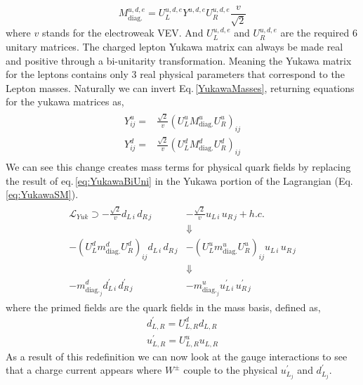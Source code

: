 %
\begin{equation}
\label{YukawaMasses} 
M^{u,d,e}_{\text{diag.}}= U^{u,d,e}_L Y^{u,d,e} U^{u,d,e}_R \frac{v}{\sqrt{2}} 
\end{equation} 
%
where $v$ stands for the electroweak VEV. And $U^{u,d,e}_L$ and $U^{u,d,e}_R$ are the required 6 unitary matrices.
%
{\color{gray} The charged lepton Yukawa matrix can always be made real and positive through a bi-unitarity transformation.  
%
Meaning the Yukawa matrix for the leptons contains only 3 real physical parameters that correspond to the Lepton masses. } 
%
Naturally we can invert Eq.\,\ref{YukawaMasses}, returning equations for the yukawa matrices as, 
\begin{align}
\label{eq:YukawaBiUni}
\begin{split}
Y^u_{ij} = & \frac{\sqrt{2}}{v} (U_L^u M^u_{\text{diag.}} U_R^u)_{ij} \\
Y^d_{ij} = & \frac{\sqrt{2}}{v} (U_L^d M^d_{\text{diag.}} U_R^d)_{ij}
\end{split}
\end{align}
%
We can see this change creates mass terms for physical quark fields by replacing the result of eq.\,\ref{eq:YukawaBiUni} in the Yukawa portion of the Lagrangian (Eq.\,\ref{eq:YukawaSM}).
%
\begin{align}
\begin{split}
\mathcal{L}_{Yuk} \supset -\frac{\sqrt{2}}{v} d_{L\,i} \, d_{R\,j} & - \frac{\sqrt{2}}{v} u_{L\,i} \, u_{R\,j} + h.c. \\ 
 & \Downarrow  \\
-(U_L^d m^d_{\text{diag.}} U_R^d)_{ij} d_{L\,i} \, d_{R\,j}  &- (U_L^u m^u_{\text{diag.}} U_R^u)_{ij} u_{L\,i} \, u_{R\,j} \\ 
& \Downarrow \\ 
-m^d_{\text{diag.}_j} d_{L\,i}^\prime \, d_{R\,j}^\prime & - m^u_{\text{diag.}_j} u_{L\,i}^\prime \, u_{R\,j}^\prime
\end{split}
\end{align}
%
where the primed fields are the quark fields in the mass basis, defined as, 
\begin{equation}
\begin{split}
d^\prime_{L,R} = U^d_{L,R} d_{L,R} \\
u^\prime_{L,R} = U^u_{L,R} u_{L,R} 
\end{split}  
\end{equation}
% 
As a result of this redefinition we can now look at the gauge interactions to see that a charge current appears where $W^\pm$ couple to the physical $u^\prime_{L_j}$ and $d^\prime_{L_j}$. 
